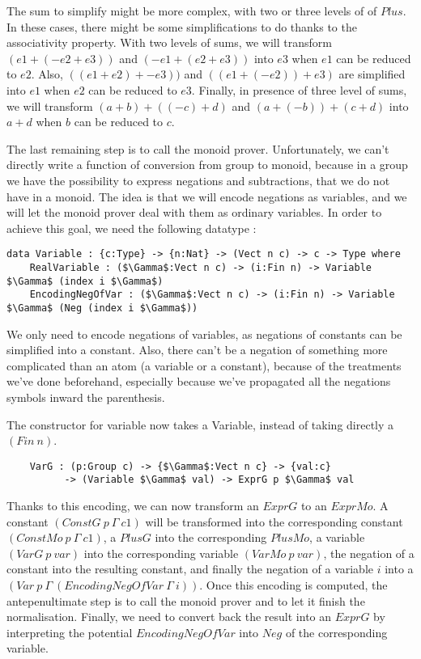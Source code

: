 The sum to simplify might be more complex, with two or three levels of of $Plus$. In these cases, there might be some simplifications to do thanks to the associativity property. With two levels of sums, we will transform $(e1 + (-e2 + e3))$ and $(-e1 + (e2+e3))$ into $e3$ when $e1$ can be reduced to $e2$. Also, $((e1+e2) + -e3))$ and $((e1+(-e2)) + e3)$ are simplified into $e1$ when $e2$ can be reduced to $e3$. Finally, in presence of three level of sums, we will transform $(a+b) + ((-c)+d)$ and $(a+(-b)) + (c+d)$ into $a+d$ when $b$ can be reduced to $c$.

The last remaining step is to call the monoid prover. Unfortunately, we can't directly write a function of conversion from group to monoid, because in a group we have the possibility to express negations and subtractions, that we do not have in a monoid. The idea is that we will encode negations as variables, and we will let the monoid prover deal with them as ordinary variables. In order to achieve this goal, we need the following datatype :


\begin{lstlisting}
data Variable : {c:Type} -> {n:Nat} -> (Vect n c) -> c -> Type where
    RealVariable : ($\Gamma$:Vect n c) -> (i:Fin n) -> Variable $\Gamma$ (index i $\Gamma$)
    EncodingNegOfVar : ($\Gamma$:Vect n c) -> (i:Fin n) -> Variable $\Gamma$ (Neg (index i $\Gamma$))
\end{lstlisting}


We only need to encode negations of variables, as negations of constants can be simplified into a constant. Also, there can't be a negation of something more complicated than an atom (a variable or a constant), because of the treatments we've done beforehand, especially because we've propagated all the negations symbols inward the parenthesis.

The constructor for variable now takes a Variable, instead of taking directly a $(Fin\ n)$.

\begin{lstlisting}
    VarG : (p:Group c) -> {$\Gamma$:Vect n c} -> {val:c} 
          -> (Variable $\Gamma$ val) -> ExprG p $\Gamma$ val
\end{lstlisting}


Thanks to this encoding, we can now transform an $ExprG$ to an $ExprMo$. A constant $(ConstG\ p\ \Gamma\ c1)$ will be transformed into the corresponding constant $(ConstMo\ p\ \Gamma\ c1)$, a $PlusG$ into the corresponding $PlusMo$, a variable $(VarG\ p\ var)$ into the corresponding variable $(VarMo\ p\ var)$, the negation of a constant into the resulting constant, and finally the negation of a variable $i$ into a $(Var\ p\ \Gamma\ (EncodingNegOfVar\ \Gamma\ i))$.
Once this encoding is computed, the antepenultimate step is to call the monoid prover and to let it finish the normalisation. Finally, we need to convert back the result into an $ExprG$ by interpreting the potential $EncodingNegOfVar$ into $Neg$ of the corresponding variable.


